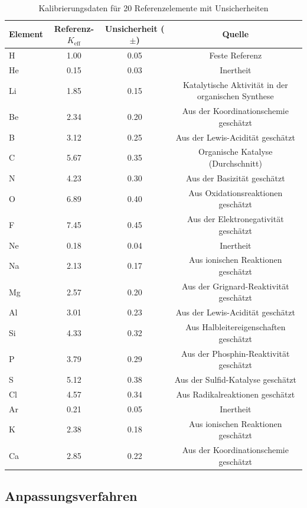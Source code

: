 \documentclass[12pt,a4paper]{article}
\newcommand{\Keff}{K_{\mathrm{eff}}}
\begin{document}
	\begin{table}[htbp]
		\centering
		\caption{Kalibrierungsdaten für 20 Referenzelemente mit Unsicherheiten}
		\label{tab:calibration}
		\begin{tabular}{lccc}
			\toprule
			Element & Referenz-$\Keff$ & Unsicherheit ($\pm$) & Quelle \\
			\midrule
			H & 1.00 & 0.05 & Feste Referenz \\
			He & 0.15 & 0.03 & Inertheit \\
			Li & 1.85 & 0.15 & Katalytische Aktivität in der organischen Synthese \\
			Be & 2.34 & 0.20 & Aus der Koordinationschemie geschätzt \\
			B & 3.12 & 0.25 & Aus der Lewis-Acidität geschätzt \\
			C & 5.67 & 0.35 & Organische Katalyse (Durchschnitt) \\
			N & 4.23 & 0.30 & Aus der Basizität geschätzt \\
			O & 6.89 & 0.40 & Aus Oxidationsreaktionen geschätzt \\
			F & 7.45 & 0.45 & Aus der Elektronegativität geschätzt \\
			Ne & 0.18 & 0.04 & Inertheit \\
			Na & 2.13 & 0.17 & Aus ionischen Reaktionen geschätzt \\
			Mg & 2.57 & 0.20 & Aus der Grignard-Reaktivität geschätzt \\
			Al & 3.01 & 0.23 & Aus der Lewis-Acidität geschätzt \\
			Si & 4.33 & 0.32 & Aus Halbleitereigenschaften geschätzt \\
			P & 3.79 & 0.29 & Aus der Phosphin-Reaktivität geschätzt \\
			S & 5.12 & 0.38 & Aus der Sulfid-Katalyse geschätzt \\
			Cl & 4.57 & 0.34 & Aus Radikalreaktionen geschätzt \\
			Ar & 0.21 & 0.05 & Inertheit \\
			K & 2.38 & 0.18 & Aus ionischen Reaktionen geschätzt \\
			Ca & 2.85 & 0.22 & Aus der Koordinationschemie geschätzt \\
			\bottomrule
		\end{tabular}
	\end{table}
	
	\subsection{Anpassungsverfahren}
	
\end{document}
